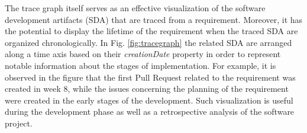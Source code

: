 The trace graph itself serves as an effective visualization of the software development artifacts (SDA) that are traced from a requirement. Moreover, it has the potential to display the lifetime of the requirement when the traced SDA are organized chronologically. In Fig. \ref{fig:tracegraph} the related SDA are arranged along a time axis based on their \textit{creationDate} property in order to represent notable information about the stages of implementation. 
For example, it is observed in the figure that the first Pull Request related to the requirement was created in week 8, while the issues concerning the planning of the requirement were created in the early stages of the development. Such visualization is useful during the development phase as well as a retrospective analysis of the software project.













